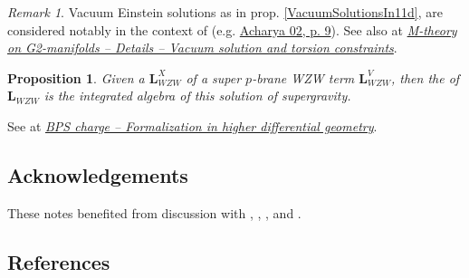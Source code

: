 \documentclass[12pt,titlepage]{article}
\theoremstyle{plain}
\newtheorem{prop}{Proposition}
\theoremstyle{definition}
\theoremstyle{remark}
\newtheorem{remark}{Remark}
\begin{document}
\begin{remark}
\label{}\hypertarget{}{}
Vacuum Einstein solutions as in prop. \ref{VacuumSolutionsIn11d}, are considered notably in the context of  (e.g. \href{http://ncatlab.org/nlab/show/M-theory+on+G2-manifolds#Acharya02}{Acharya 02, p. 9}). See also at \emph{\href{http://ncatlab.org/nlab/show/M-theory+on+G2-manifolds#VacuumSolutionsAndTorsion}{M-theory on G2-manifolds -- Details -- Vacuum solution and torsion constraints}}.
\end{remark}
\begin{prop}
\label{}\hypertarget{}{}
Given a  $\mathbf{L}_{WZW}^X$ of a super $p$-brane WZW term $\mathbf{L}_{WZW}^V$, then the  of $\mathbf{L}_{WZW}$ is the integrated  algebra of this solution of supergravity.
\end{prop}
See at \emph{\href{http://ncatlab.org/nlab/show/BPS+state#InTermsOfHigherDifferentialGeometry}{BPS charge -- Formalization in higher differential geometry}}.
\hypertarget{acknowledgements}{}\subsection*{{Acknowledgements}}\label{acknowledgements}
These notes benefited from discussion with , , ,  and .
\hypertarget{references}{}\subsection*{{References}}\label{references}
\end{document}
